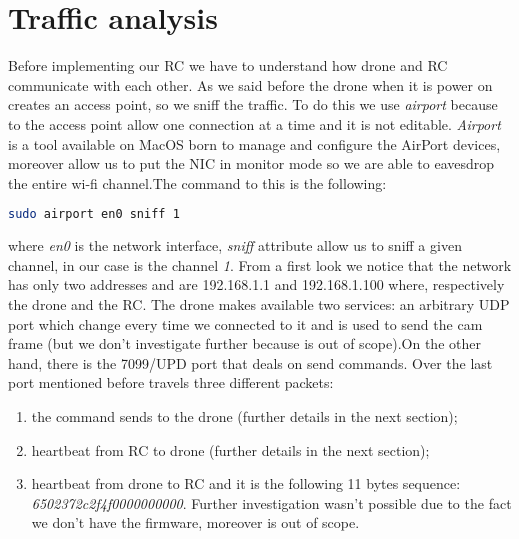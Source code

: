 \section{Traffic analysis}
Before implementing our RC we have to understand how drone and RC communicate with each other. As we said before the drone when it is power on creates an access point, so we sniff the traffic. To do this we use \textit{airport} because to the access point allow one connection at a time and it is not editable.
\textit{Airport} is a tool available on MacOS born to manage and configure the AirPort devices, moreover allow us to put the NIC in monitor mode so we are able to eavesdrop the entire wi-fi channel.The command to this is the following:
\begin{center}
    \begin{lstlisting}[language=bash]
        sudo airport en0 sniff 1
    \end{lstlisting}
\end{center}
where \textit{en0} is the network interface, \textit{sniff} attribute allow us to sniff a given channel, in our case is the channel \textit{1}.
From a first look we notice that the network has only two addresses and are 192.168.1.1 and 192.168.1.100 where, respectively the drone and the RC. The drone makes available two services: an arbitrary UDP port which change every time we connected to it and is used to send the cam frame (but we don't investigate further because is out of scope).On the other hand, there is the 7099/UPD port that deals on send commands.
Over the last port mentioned before travels three different packets:
\begin{enumerate}
    \item the command sends to the drone (further details in the next section);
    \item heartbeat from RC to drone (further details in the next section);
    \item heartbeat from drone to RC and it is the following 11 bytes sequence: \textit{6502372c2f4f0000000000}. Further investigation wasn't possible due to the fact we don't have the firmware, moreover is out of scope.
\end{enumerate}
